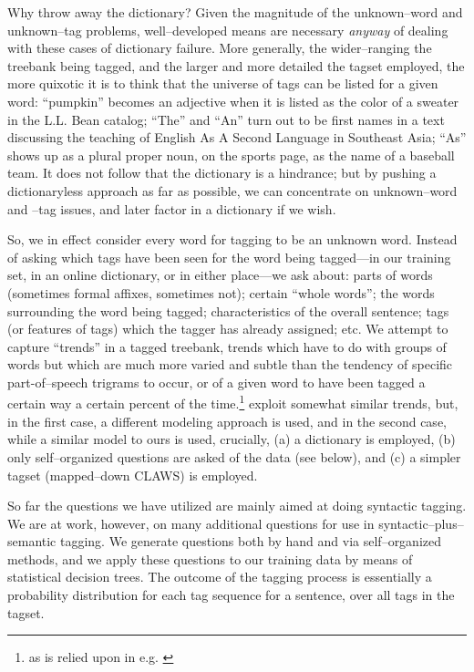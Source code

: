 Why throw away the dictionary? Given the magnitude of the
unknown--word and unknown--tag problems, well--developed means are
necessary {\em anyway} of dealing with these cases of dictionary
failure. More generally, the wider--ranging the treebank being tagged,
and the larger and more detailed the tagset employed, the more
quixotic it is to think that the universe of tags can be listed for a
given word: ``pumpkin'' becomes an adjective when it is listed as the
color of a sweater in the L.L. Bean catalog; ``The'' and ``An'' turn
out to be first names in a text discussing the teaching of English As
A Second Language in Southeast Asia; ``As'' shows up as a plural
proper noun, on the sports page, as the name of a baseball team. It
does not follow that the dictionary is a hindrance; but by pushing a
dictionaryless approach as far as possible, we can concentrate on
unknown--word and --tag issues, and later factor in a dictionary if we
wish.


So, we in effect consider every word for tagging to be an unknown
word. Instead of asking which tags have been seen for the word being
tagged---in our training set, in an online dictionary, or in either
place---we ask about: parts of words (sometimes formal affixes,
sometimes not); certain ``whole words''; the words surrounding the
word being tagged; characteristics of the overall sentence; tags (or
features of tags) which the tagger has already assigned; etc.  We
attempt to capture ``trends'' in a tagged treebank, trends which have
to do with groups of words but which are much more varied and 
subtle than the tendency of specific part-of--speech trigrams to
occur, or of a given word to have been tagged a certain way a certain
percent of the time.\footnote{as is relied upon in e.g.
\cite{Merialdo:tagging}} \cite{Brill:advances,Black+al:tag} exploit 
somewhat similar trends, but, in the first case, a different modeling
approach is used, and in the second case, while a similar model to
ours is used, crucially, (a) a dictionary is employed, (b) only
self--organized questions are asked of the data (see below), and (c) a
simpler tagset (mapped--down CLAWS) is employed.
 
So far the questions we have utilized are mainly aimed at doing
syntactic tagging. We are at work, however, on many additional
questions for use in syntactic--plus--semantic tagging. We generate
questions both by hand and via self--organized methods, and we apply
these questions to our training data by means of statistical decision
trees. The outcome of the tagging process is essentially a probability
distribution for each tag sequence for a sentence, over all tags in
the tagset.


